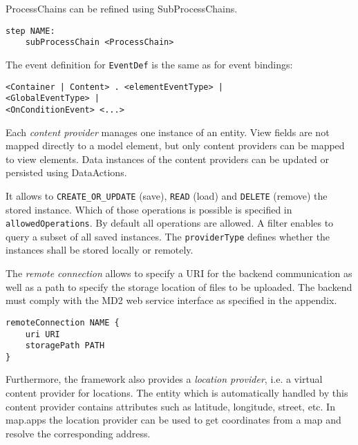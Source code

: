 ProcessChains can be refined using SubProcessChains.
\begin{lstlisting}
step NAME:
	subProcessChain <ProcessChain>
\end{lstlisting}

The event definition for \lstinline!EventDef! is the same as for event bindings:
\begin{lstlisting}
<Container | Content> . <elementEventType> |
<GlobalEventType> |
<OnConditionEvent> <...>
\end{lstlisting}

Each \textit{content provider} manages one instance of an entity. View fields are not mapped directly to a model element, but only content providers can be mapped to view elements. Data instances of the content providers can be updated or persisted using DataActions.

It allows to \lstinline!CREATE_OR_UPDATE! (save), \lstinline!READ! (load) and \lstinline!DELETE! (remove) the stored instance. Which of those operations is possible is specified in \lstinline!allowedOperations!. By default all operations are allowed. A filter enables to query a subset of all saved instances. The \lstinline!providerType! defines whether the instances shall be stored locally or remotely.

The \textit{remote connection} allows to specify a URI for the backend communication as well as a path to specify the storage location of files to be uploaded. The backend must comply with the MD2 web service interface as specified in the appendix. 
\begin{lstlisting}
remoteConnection NAME {
	uri URI
	storagePath PATH
}
\end{lstlisting}

Furthermore, the \MD framework also provides a \textit{location provider}, i.e. a virtual content provider for locations. The entity which is automatically handled by this content provider contains attributes such as latitude, longitude, street, etc. In map.apps the location provider can be used to get coordinates from a map and resolve the corresponding address.
